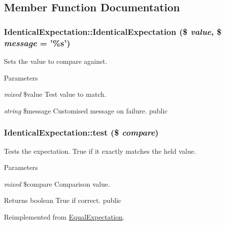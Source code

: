 \subsection{Member Function Documentation}
\hypertarget{class_identical_expectation_afe432a076cb2c4c1eaaeaab22bb6c63f}{
\subsubsection[{IdenticalExpectation}]{\setlength{\rightskip}{0pt plus 5cm}IdenticalExpectation::IdenticalExpectation (\$ {\em value}, \/  \$ {\em message} = {\ttfamily '\%s'})}}
\label{class_identical_expectation_afe432a076cb2c4c1eaaeaab22bb6c63f}
Sets the value to compare against. 
\begin{DoxyParams}{Parameters}
\item[{\em mixed}]\$value Test value to match. \item[{\em string}]\$message Customised message on failure.  public \end{DoxyParams}
\hypertarget{class_identical_expectation_a6076cd232c16294ca0a7979ce11e57da}{
\subsubsection[{test}]{\setlength{\rightskip}{0pt plus 5cm}IdenticalExpectation::test (\$ {\em compare})}}
\label{class_identical_expectation_a6076cd232c16294ca0a7979ce11e57da}
Tests the expectation. True if it exactly matches the held value. 
\begin{DoxyParams}{Parameters}
\item[{\em mixed}]\$compare Comparison value. \end{DoxyParams}
\begin{DoxyReturn}{Returns}
boolean True if correct.  public 
\end{DoxyReturn}


Reimplemented from \hyperlink{class_equal_expectation_a412b216b1ba36e37d342aebb821ccb55}{EqualExpectation}.

